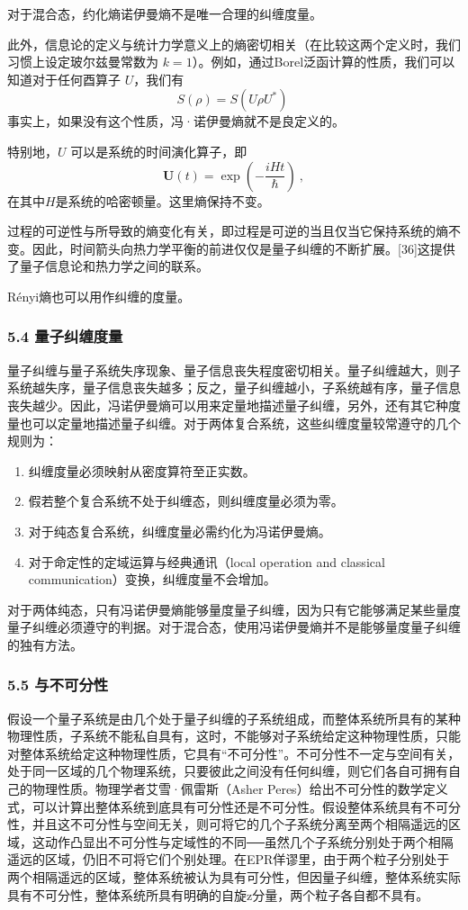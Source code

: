 对于混合态，约化熵诺伊曼熵不是唯一合理的纠缠度量。

此外，信息论的定义与统计力学意义上的熵密切相关（在比较这两个定义时，我们习惯上设定玻尔兹曼常数为 $k=1$）。例如，通过Borel泛函计算的性质，我们可以知道对于任何酉算子 $U$，我们有
$$S(\rho) = S(U\rho U^*)~$$
事实上，如果没有这个性质，冯·诺伊曼熵就不是良定义的。

特别地，$U$ 可以是系统的时间演化算子，即
$$\mathbf{U}(t)=\exp\left(-\frac{iHt}{\hbar}\right)~,$$
在其中$H$是系统的哈密顿量。这里熵保持不变。

过程的可逆性与所导致的熵变化有关，即过程是可逆的当且仅当它保持系统的熵不变。因此，时间箭头向热力学平衡的前进仅仅是量子纠缠的不断扩展。[36]这提供了量子信息论和热力学之间的联系。

Rényi熵也可以用作纠缠的度量。

\subsubsection{5.4 量子纠缠度量}
量子纠缠与量子系统失序现象、量子信息丧失程度密切相关。量子纠缠越大，则子系统越失序，量子信息丧失越多；反之，量子纠缠越小，子系统越有序，量子信息丧失越少。因此，冯诺伊曼熵可以用来定量地描述量子纠缠，另外，还有其它种度量也可以定量地描述量子纠缠。对于两体复合系统，这些纠缠度量较常遵守的几个规则为：
\begin{enumerate}
\item 纠缠度量必须映射从密度算符至正实数。
\item 假若整个复合系统不处于纠缠态，则纠缠度量必须为零。
\item 对于纯态复合系统，纠缠度量必需约化为冯诺伊曼熵。
\item 对于命定性的定域运算与经典通讯（local operation and classical communication）变换，纠缠度量不会增加。
\end{enumerate}
对于两体纯态，只有冯诺伊曼熵能够量度量子纠缠，因为只有它能够满足某些量度量子纠缠必须遵守的判据。对于混合态，使用冯诺伊曼熵并不是能够量度量子纠缠的独有方法。

\subsubsection{5.5 与不可分性}
假设一个量子系统是由几个处于量子纠缠的子系统组成，而整体系统所具有的某种物理性质，子系统不能私自具有，这时，不能够对子系统给定这种物理性质，只能对整体系统给定这种物理性质，它具有“不可分性”。不可分性不一定与空间有关，处于同一区域的几个物理系统，只要彼此之间没有任何纠缠，则它们各自可拥有自己的物理性质。物理学者艾雪·佩雷斯（Asher Peres）给出不可分性的数学定义式，可以计算出整体系统到底具有可分性还是不可分性。假设整体系统具有不可分性，并且这不可分性与空间无关，则可将它的几个子系统分离至两个相隔遥远的区域，这动作凸显出不可分性与定域性的不同──虽然几个子系统分别处于两个相隔遥远的区域，仍旧不可将它们个别处理。在EPR佯谬里，由于两个粒子分别处于两个相隔遥远的区域，整体系统被认为具有可分性，但因量子纠缠，整体系统实际具有不可分性，整体系统所具有明确的自旋z分量，两个粒子各自都不具有。

